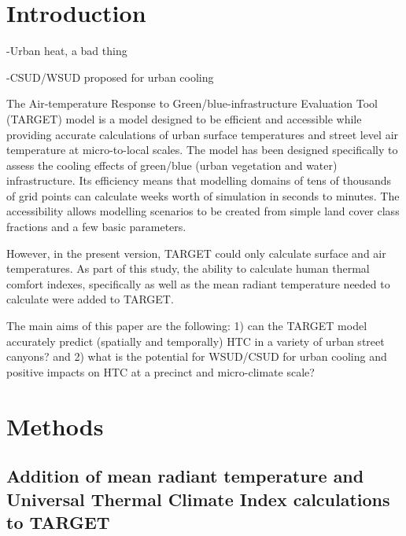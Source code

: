 \documentclass[final,3p,times,authoryear]{elsarticle}
\begin{document}
\section{Introduction}\label{sec:introduction}

-Urban heat, a bad thing

-CSUD/WSUD proposed for urban cooling



The Air-temperature Response to Green/blue-infrastructure Evaluation Tool (TARGET) model \citep{Broadbent2018} is a model designed to be efficient and accessible while providing accurate calculations of urban surface temperatures and street level air temperature at micro-to-local scales. The model has been designed specifically to assess the cooling effects of green/blue (urban vegetation and water) infrastructure. Its efficiency means that modelling domains of tens of thousands of grid points can calculate weeks worth of simulation in seconds to minutes. The accessibility allows modelling scenarios to be created from simple land cover class fractions and a few basic parameters.

However, in the present version, TARGET could only calculate surface and air temperatures. As part of this study, the ability to calculate human thermal comfort indexes, specifically  as well as the mean radiant temperature  needed to calculate  were added to TARGET.

The main aims of this paper are the following: 1) can the TARGET model accurately predict (spatially and temporally) HTC in a variety of urban street canyons? and 2) what is the potential for WSUD/CSUD for urban cooling and positive impacts on HTC at a precinct and micro-climate scale?




\section{Methods}\label{sec:Methods}



\subsection{Addition of mean radiant temperature and Universal Thermal Climate Index calculations to TARGET}\label{sec:tmrtutci}
\end{document}

